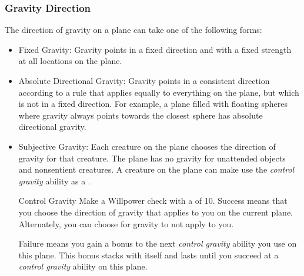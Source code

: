         \subsubsection{Gravity Direction}
            The direction of gravity on a plane can take one of the following forms:
            \begin{itemize}
                \item Fixed Gravity: Gravity points in a fixed direction and with a fixed strength at all locations on the plane.
                \item Absolute Directional Gravity: Gravity points in a consistent direction according to a rule that applies equally to everything on the plane, but which is not in a fixed direction.
                    For example, a plane filled with floating spheres where gravity always points towards the closest sphere has absolute directional gravity.
                \item Subjective Gravity: Each creature on the plane chooses the direction of gravity for that creature.
                    The plane has no gravity for unattended objects and nonsentient creatures.
                    A creature on the plane can make use the \textit{control gravity} ability as a .
                    \begin{freeability}{Control Gravity}
                        Make a Willpower check with a  of 10.
                        Success means that you choose the direction of gravity that applies to you on the current plane.
                        Alternately, you can choose for gravity to not apply to you.

                        Failure means you gain a  bonus to the next \textit{control gravity} ability you use on this plane.
                        This bonus stacks with itself and lasts until you succeed at a \textit{control gravity} ability on this plane.
                    \end{freeability}
            \end{itemize}

